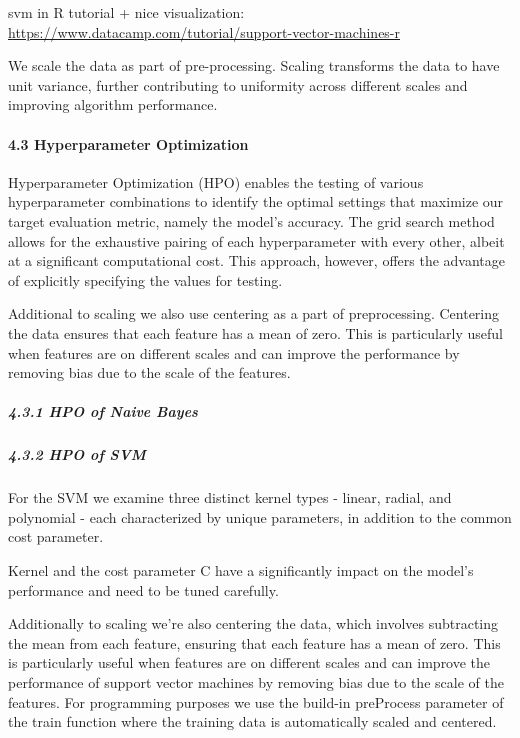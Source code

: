 \documentclass[
]{article}
\begin{document}
svm in R tutorial + nice visualization:
\url{https://www.datacamp.com/tutorial/support-vector-machines-r}

We scale the data as part of pre-processing. Scaling transforms the data
to have unit variance, further contributing to uniformity across
different scales and improving algorithm performance.

\hypertarget{hyperparameter-optimization}{%
\paragraph{4.3 Hyperparameter
Optimization}\label{hyperparameter-optimization}}

Hyperparameter Optimization (HPO) enables the testing of various
hyperparameter combinations to identify the optimal settings that
maximize our target evaluation metric, namely the model's accuracy. The
grid search method allows for the exhaustive pairing of each
hyperparameter with every other, albeit at a significant computational
cost. This approach, however, offers the advantage of explicitly
specifying the values for testing.

Additional to scaling we also use centering as a part of preprocessing.
Centering the data ensures that each feature has a mean of zero. This is
particularly useful when features are on different scales and can
improve the performance by removing bias due to the scale of the
features.

\hypertarget{hpo-of-naive-bayes}{%
\subparagraph{4.3.1 HPO of Naive Bayes}\label{hpo-of-naive-bayes}}

\hypertarget{hpo-of-svm}{%
\subparagraph{4.3.2 HPO of SVM}\label{hpo-of-svm}}

For the SVM we examine three distinct kernel types - linear, radial, and
polynomial - each characterized by unique parameters, in addition to the
common cost parameter.

Kernel and the cost parameter C have a significantly impact on the
model's performance and need to be tuned carefully.

Additionally to scaling we're also centering the data, which involves
subtracting the mean from each feature, ensuring that each feature has a
mean of zero. This is particularly useful when features are on different
scales and can improve the performance of support vector machines by
removing bias due to the scale of the features. For programming purposes
we use the build-in preProcess parameter of the train function where the
training data is automatically scaled and centered.
\end{document}
